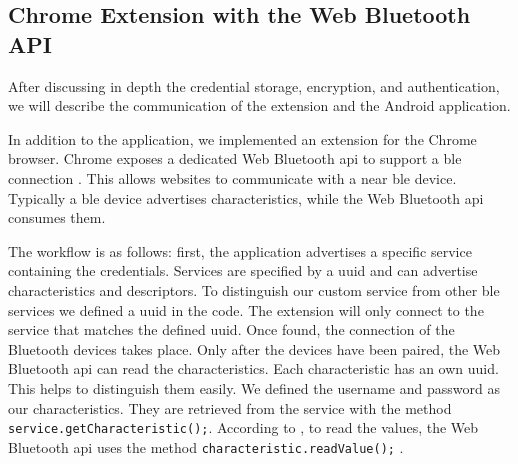 
\subsection{Chrome Extension with the Web Bluetooth API}
After discussing in depth the credential storage, encryption, and authentication, we will describe the communication of the extension and the Android application.

In addition to the application, we implemented an extension for the Chrome browser. Chrome exposes a dedicated Web Bluetooth \gls{api} to support a \gls{ble} connection \cite{WebBTAPI}. This allows websites to communicate with a near \gls{ble} device. Typically a \gls{ble} device advertises characteristics, while the Web Bluetooth \gls{api} consumes them.

The workflow is as follows: first, the application advertises a specific service containing the credentials. Services are specified by a \gls{uuid} and can advertise characteristics and descriptors. To distinguish our custom service from other \gls{ble} services we defined a \gls{uuid} in the code. The extension will only connect to the service that matches the defined \gls{uuid}. Once found, the connection of the Bluetooth devices takes place. Only after the devices have been paired, the Web Bluetooth \gls{api} can read the characteristics. Each characteristic has an own \gls{uuid}. This helps to distinguish them easily. We defined the username and password as our characteristics. They are retrieved from the service with the method \texttt{service.getCharacteristic();}. According to \cite{WebBTAPI}, to read the values, the Web Bluetooth \gls{api} uses the method \texttt{characteristic.readValue();} .
